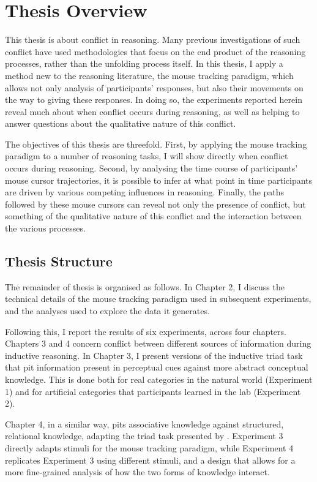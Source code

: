 \section{Thesis Overview}

This thesis is about conflict in reasoning.
Many previous investigations of such conflict
have used methodologies that focus on
the end product of the reasoning processes,
rather than the unfolding process itself.
In this thesis, I apply a method new to the reasoning literature,
the mouse tracking paradigm, which allows not only analysis of participants' responses,
but also their movements on the way to giving these responses.
In doing so, the experiments reported herein reveal much about
when conflict occurs during reasoning,
as well as helping to answer questions about the qualitative nature of this conflict.

The objectives of this thesis are threefold.
First, by applying the mouse tracking paradigm to a number of reasoning tasks,
I will show directly when conflict occurs during reasoning.
Second, by analysing the time course of participants' mouse cursor trajectories,
it is possible to infer at what point in time
participants are driven by various competing influences in reasoning.
Finally, the paths followed by these mouse cursors
can reveal not only the presence of conflict,
but something of the qualitative nature of this conflict
and the interaction between the various processes.

\subsection{Thesis Structure}

The remainder of thesis is organised as follows.
In Chapter 2, I discuss the technical details of
the mouse tracking paradigm used in subsequent experiments,
and the analyses used to explore the data it generates.

Following this, I report the results of six experiments, across four chapters.
Chapters 3 and 4 concern conflict between different
sources of information during inductive reasoning.
In Chapter 3, I present versions of the inductive triad task
that pit information present in perceptual
cues
against more abstract conceptual knowledge.
This is done both for real categories in the natural world (Experiment 1)
and for artificial categories that participants learned in the lab (Experiment 2).

Chapter 4, in a similar way, pits associative knowledge
against structured, relational knowledge,
adapting the triad task presented by \citet{Bright}.
Experiment 3 directly adapts
 stimuli for the mouse tracking paradigm,
while Experiment 4 replicates Experiment 3 using different stimuli,
and a design that allows for a more fine-grained analysis
of how the two forms of knowledge interact.

